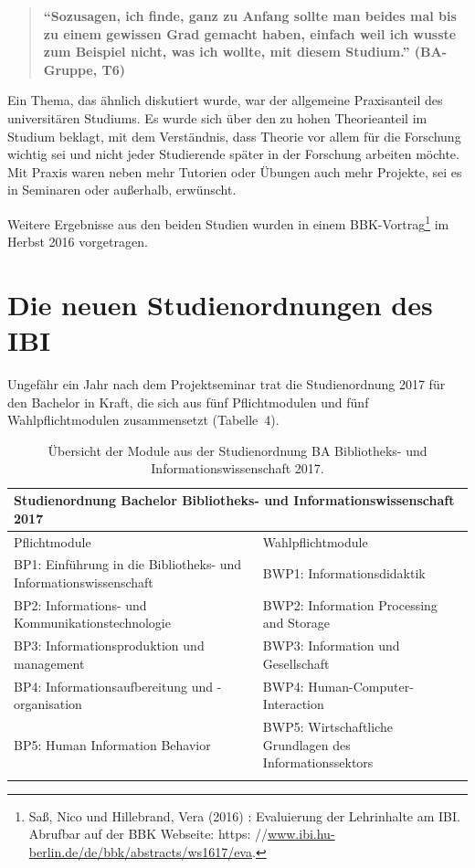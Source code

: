 \documentclass[a4paper,
fontsize=11pt,
oneside,
numbers=noperiodatend,
parskip=half-,
bibliography=totoc,
final
]{scrartcl}
\begin{document}
\begin{quote}
\textbf{\enquote{Sozusagen, ich finde, ganz zu Anfang sollte man beides
mal bis zu einem gewissen Grad gemacht haben, einfach weil ich wusste
zum Beispiel nicht, was ich wollte, mit diesem Studium.} (BA-Gruppe,
T6)}
\end{quote}

Ein Thema, das ähnlich diskutiert wurde, war der allgemeine Praxisanteil
des universitären Studiums. Es wurde sich über den zu hohen
Theorieanteil im Studium beklagt, mit dem Verständnis, dass Theorie vor
allem für die Forschung wichtig sei und nicht jeder Studierende später
in der Forschung arbeiten möchte. Mit Praxis waren neben mehr Tutorien
oder Übungen auch mehr Projekte, sei es in Seminaren oder außerhalb,
erwünscht.

Weitere Ergebnisse aus den beiden Studien wurden in einem
BBK-Vortrag\footnote{Saß, Nico und Hillebrand, Vera (2016) : Evaluierung
  der Lehrinhalte am IBI. Abrufbar auf der BBK Webseite: https:
  //\href{http://www.ibi.hu-berlin.de/de/bbk/abstracts/ws1617/eva}{www.ibi.hu-berlin.de/de/bbk/abstracts/ws1617/eva}.}
im Herbst 2016 vorgetragen.


\section{Die neuen Studienordnungen des IBI}

Ungefähr ein Jahr nach dem Projektseminar trat die Studienordnung 2017
für den Bachelor in Kraft, die sich aus fünf Pflichtmodulen und fünf
Wahlpflichtmodulen zusammensetzt (Tabelle~4).

\begin{longtable}[]{@{}p{8cm}p{8cm}@{}}
\toprule
\multicolumn{2}{l}{\textbf{Studienordnung Bachelor Bibliotheks- und Informationswissenschaft 2017}} \tabularnewline
\midrule
\endhead
Pflichtmodule & Wahlpflichtmodule\tabularnewline
\midrule
BP1: Einführung in die Bibliotheks- und Informationswissenschaft & BWP1:
Informationsdidaktik\tabularnewline
BP2: Informations- und Kommunikationstechnologie & BWP2: Information
Processing and Storage\tabularnewline
BP3: Informationsproduktion und \-manage\-ment & BWP3: Information und
Gesellschaft\tabularnewline
BP4: Informationsaufbereitung und -organi\-sation & BWP4:
Human-Computer-Interaction\tabularnewline
BP5: Human Information Behavior & BWP5: Wirtschaftliche Grundlagen des
Informationssektors\tabularnewline
\bottomrule
\caption{Übersicht der Module aus der Studienordnung BA Bibliotheks-
und Informationswissenschaft 2017.}
\end{longtable}
\end{document}
